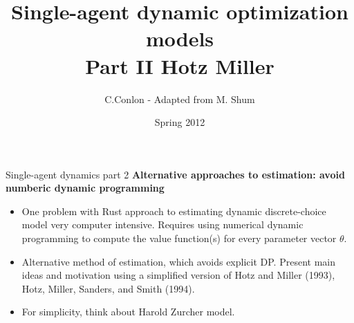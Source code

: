\def\beamerclassoptions{[xcolor=pdftex,dvipsnames,table,mathserif]}


\usepackage[english]{babel}
\usepackage{pgf,pgfarrows,pgfnodes,pgfautomata,pgfheaps}
\usepackage{amsmath,amssymb,setspace}
\usepackage[latin1]{inputenc}
\usepackage[T1]{fontenc}
\usepackage{relsize}
\usepackage[absolute,overlay]{textpos} 
\newenvironment{reference}[2]{%
  \begin{textblock*}{\textwidth}(#1,#2) 
      \footnotesize\it\bgroup\color{red!50!black}}{\egroup\end{textblock*}} 



\title [Single-agent dynamic optimization models]{Single-agent dynamic optimization models\\
Part II Hotz Miller}
\author{C.Conlon - Adapted from M. Shum}
\date{Spring 2012}


\begin{frame}
\titlepage
\end{frame}


\begin{frame}{Single-agent dynamics part 2}
\textbf{Alternative approaches to estimation: avoid numberic dynamic programming} \\
\begin{itemize}
\item One problem with Rust approach to estimating dynamic discrete-choice model very computer intensive. Requires using numerical dynamic programming to compute the value function(s) for every parameter vector $\theta$.
\item Alternative method of estimation, which avoids explicit DP. Present main ideas and motivation using a simplified version of Hotz and Miller (1993), Hotz, Miller, Sanders, and Smith (1994). \\
\item For simplicity, think about Harold Zurcher model.
\end{itemize}
\end{frame}



